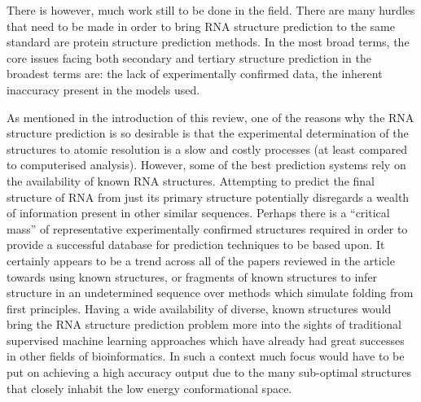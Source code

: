 \documentclass[journal]{IEEEtran}
\begin{document}
There is however, much work still to be done in the field. There are many hurdles that need to be made in order to bring RNA structure prediction to the same standard are protein structure prediction methods. In the most broad terms, the core issues facing both secondary and tertiary structure prediction in the broadest terms are: the lack of experimentally confirmed data, the inherent inaccuracy present in the models used.

As mentioned in the introduction of this review, one of the reasons why the RNA structure prediction is so desirable is that the experimental determination of the structures to atomic resolution is a slow and costly processes (at least compared to computerised analysis). However, some of the best prediction systems rely on the availability of known RNA structures. Attempting to predict the final structure of RNA from just its primary structure potentially disregards a wealth of information present in other similar sequences. Perhaps there is a ``critical mass'' of representative experimentally confirmed structures required in order to provide a successful database for prediction techniques to be based upon. It certainly appears to be a trend across all of the papers reviewed in the article towards using known structures, or fragments of known structures to infer structure in an undetermined sequence over methods which simulate folding from first principles. Having a wide availability of diverse, known structures would bring the RNA structure prediction problem more into the sights of traditional supervised machine learning approaches which have already had great successes in other fields of bioinformatics. In such a context much focus would have to be put on achieving a high accuracy output due to the many sub-optimal structures that closely inhabit the low energy conformational space.
\end{document}
